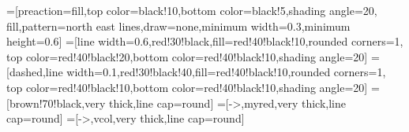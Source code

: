 \tikzset{>=latex} %
\contourlength{1.4pt}

=[preaction={fill,top color=black!10,bottom color=black!5,shading angle=20},
                    fill,pattern=north east lines,draw=none,minimum width=0.3,minimum height=0.6]
=[line width=0.6,red!30!black,fill=red!40!black!10,rounded corners=1,
                  top color=red!40!black!20,bottom color=red!40!black!10,shading angle=20]
=[dashed,line width=0.1,red!30!black!40,fill=red!40!black!10,rounded corners=1,
                        top color=red!40!black!10,bottom color=red!40!black!10,shading angle=20]
=[brown!70!black,very thick,line cap=round]
\def\rope#1{ \draw[black,line width=1.4] #1; \draw[rope,line width=1.1] #1; }
=[->,myred,very thick,line cap=round]
=[->,vcol,very thick,line cap=round]

\def\L{2.6} %
\def\ang{-32} %
\def\R{0.25} %
\def\y{-1.14*\L} %


